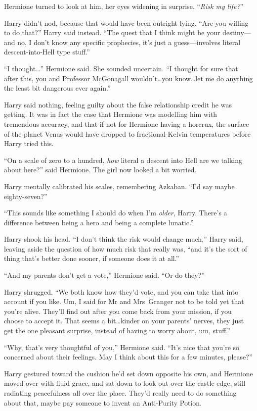 Hermione turned to look at him, her eyes widening in surprise. “\emph{Risk my life?}”

Harry didn’t nod, because that would have been outright lying. “Are you willing to do that?” Harry said instead. “The quest that I think might be your destiny—and no, I don’t know any specific prophecies, it’s just a guess—involves literal descent-into-Hell type stuff.”

“I thought…” Hermione said. She sounded uncertain. “I thought for sure that after this, you and Professor McGonagall wouldn’t…you know…let me do anything the least bit dangerous ever again.”

Harry said nothing, feeling guilty about the false relationship credit he was getting. It was in fact the case that Hermione was modelling him with tremendous accuracy, and that if not for Hermione having a horcrux, the surface of the planet Venus would have dropped to fractional-Kelvin temperatures before Harry tried this.

“On a scale of zero to a hundred, \emph{how} literal a descent into Hell are we talking about here?” said Hermione. The girl now looked a bit worried.

Harry mentally calibrated his scales, remembering Azkaban. “I’d say maybe eighty-seven?”

“This sounds like something I should do when I’m \emph{older}, Harry. There’s a difference between being a hero and being a complete lunatic.”

Harry shook his head. “I don’t think the risk would change much,” Harry said, leaving aside the question of how much risk that really was, “and it’s the sort of thing that’s better done sooner, if someone does it at all.”

“And my parents don’t get a vote,” Hermione said. “Or do they?”

Harry shrugged. “We both know how they’d vote, and you can take that into account if you like. Um, I said for Mr and Mrs~Granger not to be told yet that you’re alive. They’ll find out after you come back from your mission, if you choose to accept it. That seems a bit…kinder on your parents’ nerves, they just get the one pleasant surprise, instead of having to worry about, um, stuff.”

“Why, that’s very thoughtful of you,” Hermione said. “It’s nice that you’re so concerned about their feelings. May I think about this for a few minutes, please?”

Harry gestured toward the cushion he’d set down opposite his own, and Hermione moved over with fluid grace, and sat down to look out over the castle-edge, still radiating peacefulness all over the place. They’d really need to do something about that, maybe pay someone to invent an Anti-Purity Potion.

